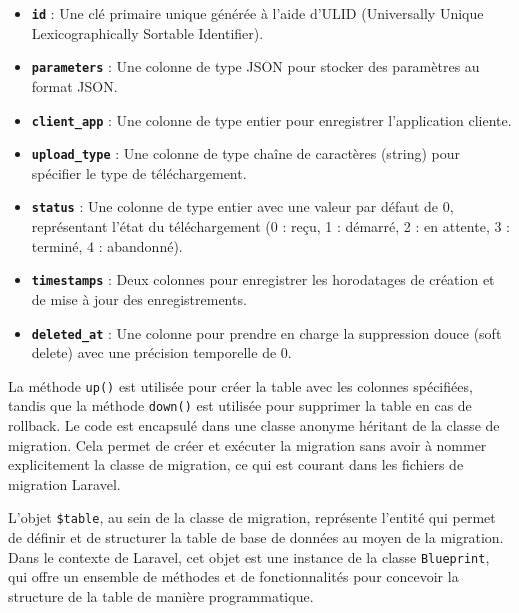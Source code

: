 \begin{itemize}
    \item \textbf{\Verb|id|} : Une clé primaire unique générée à l'aide d'ULID (Universally Unique Lexicographically Sortable Identifier).
    \item \textbf{\Verb|parameters|} : Une colonne de type JSON pour stocker des paramètres au format JSON.
    \item \textbf{\Verb|client_app|} : Une colonne de type entier pour enregistrer l'application cliente.
    \item \textbf{\Verb|upload_type|} : Une colonne de type chaîne de caractères (string) pour spécifier le type de téléchargement.
    \item \textbf{\Verb|status|} : Une colonne de type entier avec une valeur par défaut de 0, représentant l'état du téléchargement (0 : reçu, 1 : démarré, 2 : en attente, 3 : terminé, 4 : abandonné).
    \item \textbf{\Verb|timestamps|} : Deux colonnes pour enregistrer les horodatages de création et de mise à jour des enregistrements.
    \item \textbf{\Verb|deleted_at|} : Une colonne pour prendre en charge la suppression douce (soft delete) avec une précision temporelle de 0.
\end{itemize}


La méthode \Verb|up()| est utilisée pour créer la table avec les colonnes spécifiées, tandis que la méthode \Verb|down()| est utilisée pour supprimer la table en cas de rollback. Le code est encapsulé dans une classe anonyme héritant de la classe de migration. Cela permet de créer et exécuter la migration sans avoir à nommer explicitement la classe de migration, ce qui est courant dans les fichiers de migration Laravel.

L'objet \Verb|$table|, au sein de la classe de migration, représente l'entité qui permet de définir et de structurer la table de base de données au moyen de la migration. Dans le contexte de Laravel, cet objet est une instance de la classe \Verb|Blueprint|, qui offre un ensemble de méthodes et de fonctionnalités pour concevoir la structure de la table de manière programmatique.

